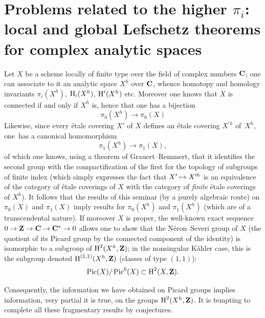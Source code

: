 \section[Problems related to the higher $\pi_i$]{Problems related to the higher $\pi_i$: local and global Lefschetz theorems for complex analytic spaces\protect\ndemark} \label{XIII.4}

Let $X$ be a scheme locally of finite type over the field of complex numbers $\mathbf{C}$, one can associate to it an analytic space $X^h$ over $\mathbf{C}$, whence homotopy and homology invariants $\pi_i(X^h)$, $\operatorname{H}_i(X^h)$, $\operatorname{H}^i(X^h)$ etc.  Moreover one knows that $X$ is connected if and only if $X^h$ is, hence that one has a bijection
$$
\pi_0(X^h)\to \pi_0(X)$$
Likewise, since every \'etale covering $X'$ of $X$ defines an \'etale covering $X^{\prime h}$ of~$X^h$, one~has a canonical homomorphism
$$
\pi_1(X^h)\to \pi_1(X),
$$
of which one knows, using a theorem of Grauert--Remmert, that it identifies the second group with the compactification of the first for the topology of subgroups of finite index (which simply expresses the fact that $X'\mto X^{\prime h}$ is an equivalence of the category of \'etale coverings of $X$ with the category of \emph{finite} \'etale coverings of $X^h$). It follows that the results of this seminar (by a purely algebraic route) on $\pi_0(X)$ and $\pi_1(X)$ imply results for $\pi_0(X^h)$ and $\pi_1(X^h)$ (which are of a transcendental nature). If moreover $X$ is proper, the well-known exact sequence $0\to \ZZ \to \CC\to \CC^*\to 0$ allows one to show that the N\'eron--Severi group of $X$ (the quotient of its Picard group by the connected component of the identity) is isomorphic to a subgroup of $\operatorname{H}^2(X^h, \mathbf{Z})$; in the nonsingular K\"ahler case, this is the subgroup denoted $\operatorname{H}^{(1, 1)}(X^h, \mathbf{Z})$ (classes of type $(1, 1)$):
$$
\operatorname{Pic}(X)/\operatorname{Pic}^0(X)\subset \operatorname{H}^2(X, \mathbf{Z}).
$$

Consequently, the information we have obtained on Picard groups implies information, very partial it is true, on the groups $\operatorname{H}^2(X^h, \mathbf{Z})$. It is tempting to complete all these fragmentary results by conjectures.

